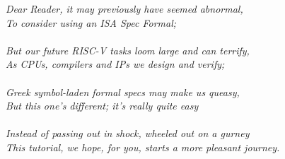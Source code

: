     \emph{Dear Reader, it may previously have seemed abnormal,} \\
    \emph{To consider using an ISA Spec Formal;} \\
    \hmm \\
    \emph{But our future RISC-V tasks loom large and can terrify,} \\
    \emph{As CPUs, compilers and IPs we design and verify;} \\
    \hmm \\
    \emph{Greek symbol-laden formal specs may make us queasy,} \\
    \emph{But this one's different; it's really quite easy} \\
    \hmm \\
    \emph{Instead of passing out in shock, wheeled out on a gurney} \\
    \emph{This tutorial, we hope, for you, starts a more pleasant journey.}
